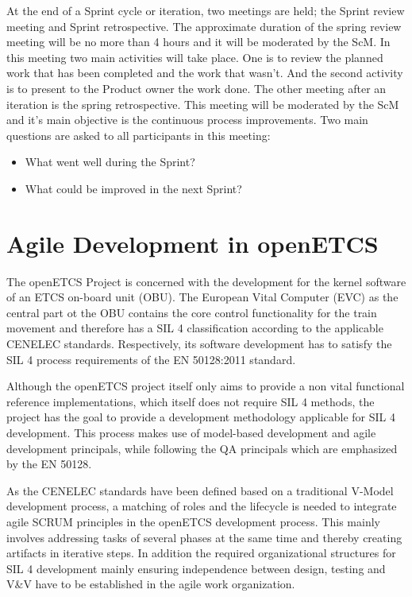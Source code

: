 At the end of a Sprint cycle or iteration, two meetings are held; the Sprint review meeting and Sprint retrospective. The approximate duration of the spring review meeting will be no more than 4 hours and it will be moderated by the ScM. In this meeting two main activities will take place. One is to review the planned work that has been completed and the work that wasn't. And the second activity is to present to the Product owner the work done. The other meeting after an iteration is the spring retrospective. This meeting will be moderated by the ScM and it's main objective is the continuous process improvements. Two main questions are asked to all participants in this meeting:
\begin{itemize}
\item What went well during the Sprint? 
\item What could be improved in the next Sprint? 
\end{itemize}


\chapter{Agile Development in openETCS}
\label{sec:agile}

The openETCS Project is concerned with the development for the kernel software of an ETCS on-board unit (OBU). The European Vital Computer (EVC) as the central part ot the OBU contains the core control functionality for the train movement and therefore has a SIL 4 classification according to the applicable CENELEC standards. Respectively, its software development has to satisfy the SIL 4 process requirements of the EN 50128:2011 standard. 

Although the openETCS project itself only aims to provide a non vital functional reference implementations, which itself does not require SIL 4 methods, the project has the goal to provide a development methodology applicable for SIL 4 development. This process makes use of model-based development and agile development principals, while following the QA principals which are emphasized by the EN 50128. 

As the CENELEC standards have been defined based on a traditional V-Model development process, a matching of roles and the lifecycle is needed to integrate agile SCRUM principles in the openETCS development process. This mainly involves addressing tasks of several phases at the same time and thereby creating artifacts in iterative steps. In addition the required organizational structures for SIL 4 development mainly ensuring independence between design, testing and V\&V have to be established in the agile work organization.

